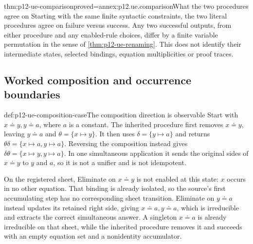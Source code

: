 \begin{hbcorollary}{thm:p12-ue-comparison}{proved=annex:p12.ue.comparison}{What the two procedures agree on}
Starting with the same finite syntactic constraints, the two literal
procedures agree on failure versus success. Any two successful outputs,
from either procedure and any enabled-rule choices, differ by a finite
variable permutation in the sense of \cref{thm:p12-ue-renaming}.
This does not identify their intermediate states, selected bindings,
equation multiplicities or proof traces.
\end{hbcorollary}

\subsection{Worked composition and occurrence boundaries}

\begin{hbexample}{def:p12-ue-composition-case}{The composition direction is observable}
Start with \(x\doteq y,y\doteq a\), where \(a\) is a constant.
The inherited procedure first removes \(x\doteq y\), leaving
\(y\doteq a\) and \(\theta=\{x\mapsto y\}\). It then uses
\(\delta=\{y\mapsto a\}\) and returns
\(\theta\delta=\{x\mapsto a,y\mapsto a\}\).
Reversing the composition instead gives
\(\delta\theta=\{x\mapsto y,y\mapsto a\}\). In one simultaneous
application it sends the original sides of \(x\doteq y\) to
\(y\) and \(a\), so it is not a unifier and is not idempotent.

On the registered sheet, Eliminate on \(x\doteq y\) is not enabled
at this state: \(x\) occurs in no other equation. That binding is
already isolated, so the source's first accumulating step has no
corresponding sheet transition. Eliminate on \(y\doteq a\) instead
updates its retained right side, giving
\(x\doteq a,y\doteq a\), which is irreducible and extracts the
correct simultaneous answer. A singleton \(x\doteq a\) is already
irreducible on that sheet, while the inherited procedure removes it
and succeeds with an empty equation set and a nonidentity accumulator.
\end{hbexample}

